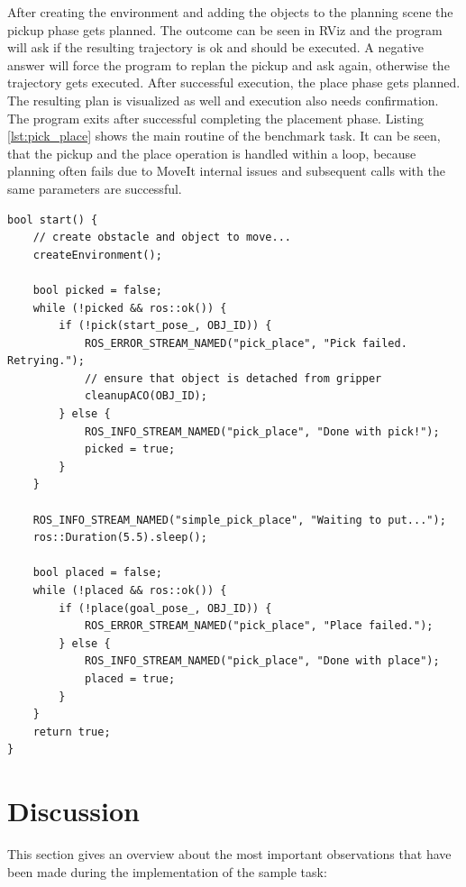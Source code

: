 After creating the environment and adding the objects to the planning scene the pickup phase gets planned. The outcome can be seen in RViz and the program will ask if the resulting trajectory is ok and should be executed. A negative answer will force the program to replan the pickup and ask again, otherwise the trajectory gets executed. After successful execution, the place phase gets planned. The resulting plan is visualized as well and execution also needs confirmation. The program exits after successful completing the placement phase. Listing \ref{lst:pick_place} shows the main routine of the benchmark task. It can be seen, that the pickup and the place operation is handled within a loop, because planning often fails due to MoveIt internal issues and subsequent calls with the same parameters are successful.

\lstset{style=customc}
\begin{minipage}{\linewidth}
\begin{lstlisting}[caption={Benchmark task main routine}, label=lst:pick_place]
bool start() {
	// create obstacle and object to move...
	createEnvironment();

	bool picked = false;
	while (!picked && ros::ok()) {
		if (!pick(start_pose_, OBJ_ID)) {
			ROS_ERROR_STREAM_NAMED("pick_place", "Pick failed. Retrying.");
			// ensure that object is detached from gripper
			cleanupACO(OBJ_ID);
		} else {
			ROS_INFO_STREAM_NAMED("pick_place",	"Done with pick!");
            picked = true;
		}
	}

	ROS_INFO_STREAM_NAMED("simple_pick_place", "Waiting to put...");
	ros::Duration(5.5).sleep();

	bool placed = false;
	while (!placed && ros::ok()) {
		if (!place(goal_pose_, OBJ_ID)) {
			ROS_ERROR_STREAM_NAMED("pick_place", "Place failed.");
		} else {
			ROS_INFO_STREAM_NAMED("pick_place", "Done with place");
			placed = true;
		}
	}
	return true;
}
\end{lstlisting}
\end{minipage}

\section{Discussion}

This section gives an overview about the most important observations that have been made during the implementation of the sample task:

